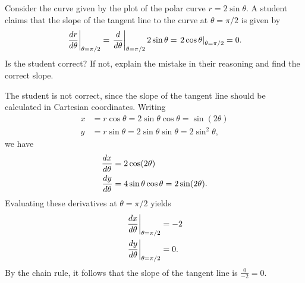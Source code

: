 \documentclass[]{ximera}
\begin{document}
\begin{problem}
Consider the curve given by the plot of the polar curve $r = 2 \sin \theta$. A student claims that the slope of the tangent line to the curve at $\theta = \pi/2$ is given by
$$
\left.\frac{\mathop{}\!d r}{\mathop{}\!d \theta}\right|_{\theta = \pi/2} = \left. \frac{\mathop{}\!d}{\mathop{}\!d \theta } \right|_{\theta = \pi/2} 2 \sin \theta =  \left.2 \cos \theta \right|_{\theta = \pi/2} = 0.
$$
Is the student correct? If not, explain the mistake in their reasoning and find the correct slope.
\begin{solution}
The student is not correct, since the slope of the tangent line should be calculated in Cartesian coordinates. Writing
\begin{align*}
x &= r \cos \theta = 2 \sin \theta \cos \theta = \sin (2\theta) \\
y &= r \sin \theta = 2 \sin \theta \sin \theta = 2 \sin^2 \theta,
\end{align*}
we have
\begin{align*}
\frac{\mathop{}\!d x}{\mathop{}\!d \theta} &= 2 \cos (2 \theta) \\
\frac{\mathop{}\!d y}{\mathop{}\!d \theta} &= 4 \sin \theta \cos \theta = 2 \sin(2\theta).
\end{align*}
Evaluating these derivatives at $\theta = \pi/2$ yields
\begin{align*}
\left.\frac{\mathop{}\!d x}{\mathop{}\!d \theta}\right|_{\theta = \pi/2} &= -2 \\
\left.\frac{\mathop{}\!d y}{\mathop{}\!d \theta}\right|_{\theta = \pi/2} &= 0.
\end{align*}
By the chain rule, it follows that the slope of the tangent line is $\frac{0}{-2} = 0$. 
\end{solution}
\end{problem}
\end{document}
